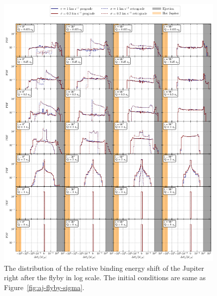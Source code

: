 \documentclass[twocolumn]{aastex63}
\newcommand*\fgr[1]{Figure~\ref{#1}}
\begin{document}
\begin{figure}
    \includegraphics[width=\textwidth]{figs/dEj-flyby-sigma.pdf}
    \caption{The distribution of the relative binding energy shift of the Jupiter right after the flyby in log scale. The initial conditions are same as \fgr{fig:aj-flyby-sigma}.} 
    \label{fig:dEj-flyby-sigma}
\end{figure}
\end{document}
